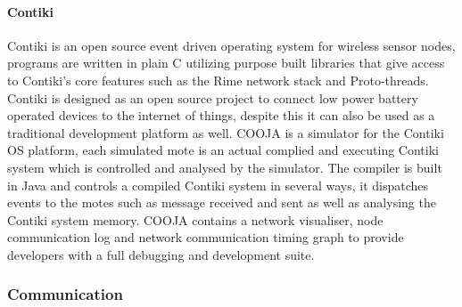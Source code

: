 \paragraph{Contiki} Contiki is an open source event driven operating system for wireless sensor nodes, programs are written in plain C utilizing purpose built libraries that give access to Contiki's core features such as the Rime network stack and Proto-threads\cite{protothreads}. Contiki is designed as an open source project to connect low power battery operated devices to the internet of things\cite{Atzori20102787}, despite this it can also be used as a traditional development platform as well. COOJA is a simulator for the Contiki OS platform, each simulated mote is an actual complied and executing Contiki system which is controlled and analysed by the simulator. The compiler is built in Java and controls a compiled Contiki system in several ways, it dispatches events to the motes such as message received and sent as well as analysing the Contiki system memory. COOJA contains a network visualiser, node communication log and network communication timing graph to provide developers with a full debugging and development suite.

\subsubsection{Communication}

